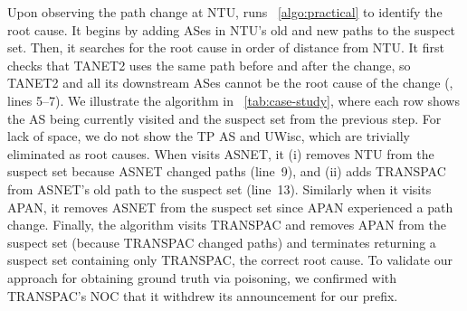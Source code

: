 %

Upon observing the path change at
NTU, \ouralgo runs \algstr~\ref{algo:practical} to identify the root
cause. It begins by adding ASes in NTU's old and new paths to the suspect
set. Then, it searches for the root cause in order of distance from NTU.
It first checks that TANET2 uses the same
path before and after the change, so TANET2 and all its downstream ASes 
cannot be the root cause of the change (\localC, lines 5--7).
We illustrate the algorithm in \tab~\ref{tab:case-study}, where each row shows the AS being currently visited
and the suspect set from the previous step.  For lack of space, we
do not show the TP AS and UWisc, which are trivially eliminated as root causes.
When \ouralgo visits ASNET, it
(i) removes NTU from the suspect set because ASNET changed paths (line~9),
and (ii) adds TRANSPAC from ASNET's old path
to the suspect set (line~13).
Similarly when it visits APAN, it removes ASNET from the suspect set since
APAN experienced a path change.
Finally, the algorithm visits TRANSPAC and removes APAN from the
suspect set (because TRANSPAC changed paths) and terminates returning
a suspect set containing only TRANSPAC, the correct root cause.
To validate our approach for obtaining ground truth via poisoning, we confirmed 
with TRANSPAC's NOC that it withdrew its announcement for our prefix.

